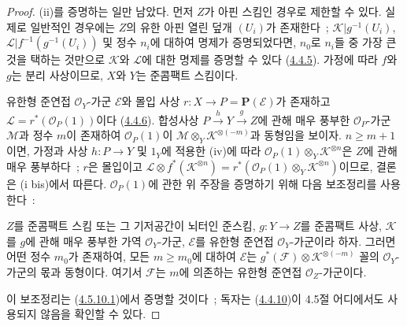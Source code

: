 \begin{proof}
(ii)를 증명하는 일만 남았다. 먼저 $Z$가 아핀 스킴인 경우로 제한할 수
있다. 실제로 일반적인 경우에는 $Z$의 유한 아핀 열린 덮개 $(U_i)$가
존재한다~; $\mathcal{K}|g^{-1}(U_i)$,
$\mathcal{L}|f^{-1}(g^{-1}(U_i))$ 및 정수 $n_i$에 대하여 명제가
증명되었다면, $n_0$로 $n_i$들 중 가장 큰 것을 택하는 것만으로
$\mathcal{K}$와 $\mathcal{L}$에 대한 명제를 증명할 수 있다
(\hyperref[II.4.4.5-ko]{4.4.5}). 가정에 따라 $f$와 $g$는 분리
사상이므로, $X$와 $Y$는 준콤팩트 스킴이다.

유한형 준연접 $\mathcal{O}_Y$-가군 $\mathcal{E}$와 몰입 사상
$r:X\to P=\mathbf{P}(\mathcal{E})$가 존재하고
$\mathcal{L}=r^*(\mathcal{O}_P(1))$이다
(\hyperref[II.4.4.6-ko]{4.4.6}). 합성사상
$P\xrightarrow{h}Y\xrightarrow{g}Z$에 관해 매우 풍부한
$\mathcal{O}_P$-가군 $\mathcal{M}$과 정수 $m$이 존재하여
$\mathcal{O}_P(1)$이
$\mathcal{M}\otimes_Y\mathcal{K}^{\otimes(-m)}$과 동형임을 보이자.
$n\geq m+1$이면, 가정과 사상 $h:P\to Y$ 및 $1_Y$에 적용한 (iv)에
따라 $\mathcal{O}_P(1)\otimes_Y\mathcal{K}^{\otimes n}$은 $Z$에 관해
매우 풍부하다~; $r$은 몰입이고
$\mathcal{L}\otimes f^*(\mathcal{K}^{\otimes n})
=r^*(\mathcal{O}_P(1)\otimes_Y\mathcal{K}^{\otimes n})$이므로, 결론은
(i bis)에서 따른다. $\mathcal{O}_P(1)$에 관한 위 주장을 증명하기 위해
다음 보조정리를 사용한다~:

\begin{lemma}[4.4.10.1]
\label{II.4.4.10.1-ko}
$Z$를 준콤팩트 스킴 또는 그 기저공간이 뇌터인 준스킴,
$g:Y\to Z$를 준콤팩트 사상, $\mathcal{K}$를 $g$에 관해 매우 풍부한
가역 $\mathcal{O}_Y$-가군, $\mathcal{E}$를 유한형 준연접
$\mathcal{O}_Y$-가군이라 하자. 그러면 어떤 정수 $m_0$가 존재하여,
모든 $m\geq m_0$에 대하여 $\mathcal{E}$는
$g^*(\mathcal{F})\otimes\mathcal{K}^{\otimes(-m)}$ 꼴의
$\mathcal{O}_Y$-가군의 몫과 동형이다. 여기서 $\mathcal{F}$는
$m$에 의존하는 유한형 준연접 $\mathcal{O}_Z$-가군이다.
\end{lemma}

이 보조정리는 (\hyperref[II.4.5.10.1-ko]{4.5.10.1})에서 증명할 것이다~;
독자는 (\hyperref[II.4.4.10-ko]{4.4.10})이 4.5절 어디에서도 사용되지
않음을 확인할 수 있다.



\end{proof}
